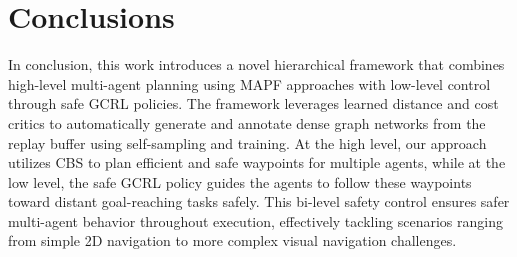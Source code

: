 \documentclass[letterpaper, 10 pt, conference]{IEEEConference}
\begin{document}
\section{Conclusions}
In conclusion, this work introduces a novel hierarchical framework that combines high-level multi-agent planning using MAPF approaches with low-level control through safe GCRL policies. The framework leverages learned distance and cost critics to automatically generate and annotate dense graph networks from the replay buffer using self-sampling and training. At the high level, our approach utilizes CBS to plan efficient and safe waypoints for multiple agents, while at the low level, the safe GCRL policy guides the agents to follow these waypoints toward distant goal-reaching tasks safely. This bi-level safety control ensures safer multi-agent behavior throughout execution, effectively tackling scenarios ranging from simple 2D navigation to more complex visual navigation challenges.

\addtolength{\textheight}{-10cm}



\end{document}
